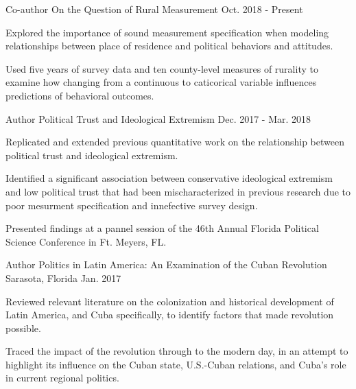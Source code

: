 \begin{cventries}
{\begin{cvitems}
        \end{cvitems}
      }
    \cventry
      {Co-author} %
      {On the Question of Rural Measurement} %
      {Oct. 2018 - Present} %
      {} %
      {
        \begin{cvitems} %
          \item {Explored the importance of sound measurement specification when modeling relationships between place of residence and political behaviors and attitudes.}
          \item {Used five years of survey data and ten county-level measures of rurality to examine how changing from a continuous to caticorical variable influences predictions of behavioral outcomes.}
        \end{cvitems}
      }
    \cventry
      {Author} %
      {Political Trust and Ideological Extremism} %
      {Dec. 2017 - Mar. 2018} %
      {} %
      {
        \begin{cvitems} %
          \item {Replicated and extended previous quantitative work on the relationship between political trust and ideological extremism.}
          \item {Identified a significant association between conservative ideological extremism and low political trust that had been mischaracterized in previous research due to poor mesurment specification and innefective survey design.}
          \item {Presented findings at a pannel session of the 46th Annual Florida Political Science Conference in Ft. Meyers, FL.}
        \end{cvitems}
      }
    \cventry
      {Author} %
      {Politics in Latin America: An Examination of the Cuban Revolution} %
      {Sarasota, Florida} %
      {Jan. 2017} %
      {
        \begin{cvitems} %
          \item {Reviewed relevant literature on the colonization and historical development of Latin America, and Cuba specifically, to identify factors that made revolution possible.}
          \item {Traced the impact of the revolution through to the modern day, in an attempt to highlight its influence on the Cuban state, U.S.-Cuban relations, and Cuba's role in current regional politics.}
        \end{cvitems}
      }


\end{cventries}

